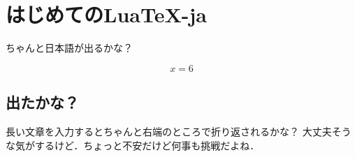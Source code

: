 \documentclass[tombow,paper={182truemm, 232truemm}]{ltjsbook}
\begin{document}
\section{はじめてのLua\TeX-ja}
ちゃんと日本語が出るかな？

$$
x = 6
$$



\subsection{出たかな？}
長い文章を入力するとちゃんと右端のところで折り返されるかな？
大丈夫そうな気がするけど．ちょっと不安だけど何事も挑戦だよね．
\end{document}
